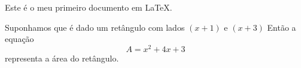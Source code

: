 \documentclass[11pt]{article}
\begin{document}
Este é o meu primeiro documento em LaTeX.

Suponhamos que é dado um retângulo com lados $(x+1)$ e $(x+3)$ Então a equação $$A=x^2+4x+3$$ representa a área do retângulo.
\end{document}
